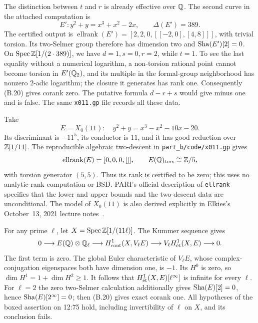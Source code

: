 The distinction between \(t\) and \(r\) is already effective over \(\mathbb Q\).
The second curve in the attached computation is
\[
 E':y^2+y=x^3+x^2-2x,
 \qquad \Delta(E')=389.
\]
The certified output is \(\operatorname{ellrank}(E')=[2,2,0,
[[-2,0],[4,8]]]\), with trivial torsion.  Its two-Selmer group
therefore has dimension two and \(\mathop{\mathrm{Sha}}(E')[2]=0\).  On
\(\operatorname{Spec}\mathbb Z[1/(2\cdot389)]\), we have \(d=1,s=0,r=2\), while
\(t=1\).  To see the last equality without a numerical logarithm,
a non-torsion rational point cannot become torsion in \(E'(\mathbb Q_2)\),
and its multiple in the formal-group neighborhood has nonzero
\(2\)-adic logarithm; the closure it generates has rank one.
Consequently (B.20) gives corank zero.  The putative formula
\(d-r+s\) would give minus one and is false.  The same
\texttt{x011.gp} file records all these data.



\begin{example}\label{ex:B-X011}
Take
\[
 E=X_0(11):\quad y^2+y=x^3-x^2-10x-20.
\]
Its discriminant is \(-11^5\), its conductor is \(11\), and it has
good reduction over \(\mathbb Z[1/11]\).  The reproducible algebraic
two-descent in \texttt{part\_b/code/x011.gp} gives
\[
 \operatorname{ellrank}(E)=[0,0,0,[]],\qquad
 E(\mathbb Q)_{\rm tors}\cong\mathbb Z/5,
\]
with torsion generator \((5,5)\).  Thus its rank is certified to be
zero; this uses no analytic-rank computation or BSD.  PARI's official
description of \texttt{ellrank} specifies that the lower and upper
bounds and the two-descent data are unconditional.  The model of
\(X_0(11)\) is also derived explicitly in Elkies's October~13, 2021
lecture notes~\cite{BElkies2021,BPari2026}.

For any prime \(\ell\), let \(X=\operatorname{Spec}\mathbb Z[1/(11\ell)]\).
The Kummer sequence gives
\[
0\longrightarrow E(\mathbb Q)\otimes\mathbb Q_\ell
\longrightarrow H^1_{\mathrm{cont}}(X,V_\ell E)
\longrightarrow V_\ell H^1_{\mathrm{\acute et}}(X,E)\longrightarrow0.
\]
The first term is zero.  The global Euler characteristic of
\(V_\ell E\), whose complex-conjugation eigenspaces both have
dimension one, is \(-1\).  Its \(H^0\) is zero, so
\(\dim H^1=1+\dim H^2\ge1\).  It follows that
\(H^1_{\mathrm{\acute et}}(X,E)[\ell^\infty]\) is infinite for every \(\ell\).
For \(\ell=2\) the zero two-Selmer calculation additionally gives
\(\mathop{\mathrm{Sha}}(E)[2]=0\), hence \(\mathop{\mathrm{Sha}}(E)[2^\infty]=0\); then (B.20)
gives exact corank one.  All hypotheses of the boxed assertion on
12:75 hold, including invertibility of \(\ell\) on \(X\), and its
conclusion fails.
\end{example}

